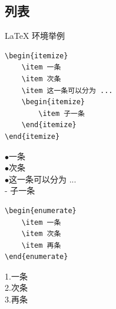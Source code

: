 \subsection{列表}
\begin{frame}[fragile]{\LaTeX{} 环境举例}
    \vspace{1em}
    \begin{minipage}{0.5\linewidth}
        \begin{lstlisting}[basicstyle=\ttfamily\small]
\begin{itemize}
    \item 一条
    \item 次条
    \item 这一条可以分为 ...
    \begin{itemize}
        \item 子一条
    \end{itemize}
\end{itemize}\end{lstlisting}
    \end{minipage}\hspace{1.5cm}
    \begin{minipage}{0.3\linewidth}
        \(\bullet\)\quad 一条\\
        \(\bullet\)\quad 次条\\
        \(\bullet\)\quad 这一条可以分为 ... \\
        \quad - \quad 子一条
    \end{minipage}

    \begin{minipage}{0.5\linewidth}
        \begin{lstlisting}
\begin{enumerate}
    \item 一条
    \item 次条
    \item 再条
\end{enumerate}\end{lstlisting}
    \end{minipage}\hspace{1.5cm}
    \begin{minipage}{0.3\linewidth}
        \vspace{-1cm}
        1.\quad 一条\\
        2.\quad 次条\\
        3.\quad 再条
    \end{minipage}
\end{frame}
%

